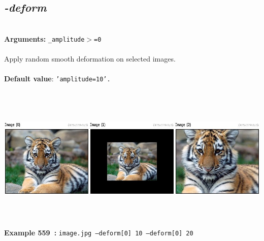 \documentclass[a4paper,11pt,twoside]{book}
\begin{document}
\subsection{\emph{-deform} }\vspace*{-0.5em}
~\\\textbf{Arguments: } 
{\small \texttt{\_amplitude$>$=0}}\\~\\
Apply random smooth deformation on selected images.
~\\~\\\textbf{Default value}: {\small \texttt{'amplitude=10'.}}
\begin{center}\includegraphics[keepaspectratio=true,height=7cm,width=\textwidth]{img/gmic_def559.jpg}\\
{\footnotesize \textbf{Example 559~:} \texttt{image.jpg --deform[0] 10 --deform[0] 20}}
\end{center}
\end{document}

